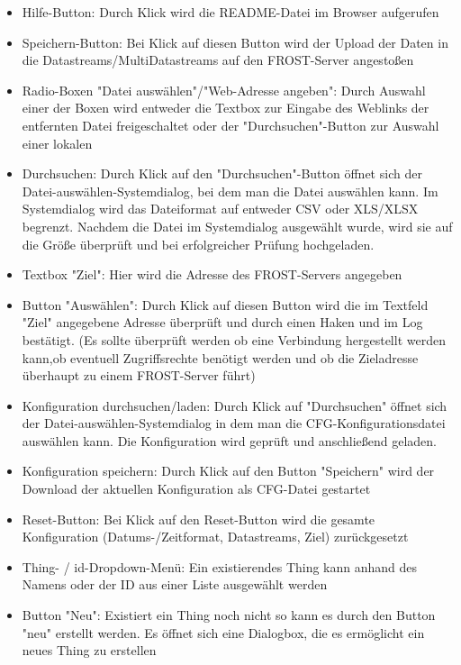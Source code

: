 \documentclass[12 pt]{article}
\begin{document}
\newpage

\begin{itemize}
\item Hilfe-Button: Durch Klick wird die README-Datei im Browser aufgerufen
\item Speichern-Button: Bei Klick auf diesen Button wird der Upload der Daten in die Datastreams/MultiDatastreams auf den FROST-Server angestoßen

\item Radio-Boxen "Datei auswählen"/"Web-Adresse angeben": Durch Auswahl einer der Boxen wird entweder die Textbox zur Eingabe des Weblinks der entfernten Datei freigeschaltet oder der "Durchsuchen"-Button zur Auswahl einer lokalen
\item Durchsuchen: Durch Klick auf den "Durchsuchen"-Button öffnet sich der Datei-auswählen-Systemdialog, bei dem man die Datei auswählen kann. Im Systemdialog wird das Dateiformat auf entweder CSV oder XLS/XLSX begrenzt. Nachdem die Datei im Systemdialog ausgewählt wurde, wird sie auf die Größe überprüft und bei erfolgreicher Prüfung hochgeladen.

\item Textbox "Ziel": Hier wird die Adresse des FROST-Servers angegeben
\item Button "Auswählen": Durch Klick auf diesen Button wird die im Textfeld "Ziel" angegebene Adresse überprüft und durch einen Haken und im Log bestätigt. (Es sollte überprüft werden ob eine Verbindung hergestellt werden kann,ob eventuell Zugriffsrechte benötigt werden und ob die Zieladresse überhaupt zu einem FROST-Server führt) 

\item Konfiguration durchsuchen/laden: Durch Klick auf "Durchsuchen" öffnet sich der Datei-auswählen-Systemdialog in dem man die CFG-Konfigurationsdatei auswählen kann. Die Konfiguration wird geprüft und anschließend geladen.
\item Konfiguration speichern: Durch Klick auf den Button "Speichern" wird der Download der aktuellen Konfiguration als CFG-Datei gestartet
\item Reset-Button: Bei Klick auf den Reset-Button wird die gesamte Konfiguration (Datums-/Zeitformat, Datastreams, Ziel) zurückgesetzt

\item Thing- / id-Dropdown-Menü: Ein existierendes Thing kann anhand des Namens oder der ID aus einer Liste ausgewählt werden
\item Button "Neu": Existiert ein Thing noch nicht so kann es durch den Button "neu" erstellt werden. Es öffnet sich eine Dialogbox, die es ermöglicht ein neues Thing zu erstellen


\end{itemize}
\end{document}

